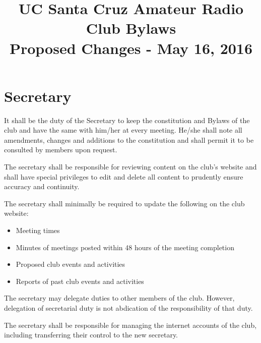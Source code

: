 \documentclass{article}
\begin{document}
\title{UC Santa Cruz Amateur Radio Club Bylaws \\ \small{Proposed Changes - May 16, 2016}}
\author{}
\date{}
\maketitle

\tableofcontents

\pagebreak

\section{Secretary}
\begin{itemize}
\item It shall be the duty of the Secretary to keep the constitution and Bylaws of the club and have the same with him/her at every meeting. He/she shall note all amendments, changes and additions to the constitution and shall permit it to be consulted by members upon request.

\item The secretary shall be responsible for reviewing content on the club's website and shall have special privileges to edit and delete all content to prudently ensure accuracy and continuity. 

{\color{blue} 
\item The secretary shall minimally be required to update the following on the club website:

\begin{itemize}
\item Meeting times
\item Minutes of meetings posted within 48 hours of the meeting completion
\item Proposed club events and activities 
\item Reports of past club events and activities
\end{itemize}
}

{\color{blue} 
\item The secretary may delegate duties to other members of the club. However, delegation of secretarial duty is not abdication of the responsibility of that duty.  
}

{\color{blue}
\item The secretary shall be responsible for managing the internet accounts of the club, including transferring their control to the new secretary.
}

\end{itemize}
\end{document}
